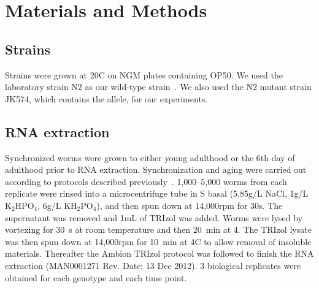 \section*{Materials and Methods}
\label{sec:materials_methods}

\subsection*{Strains}
\label{sub:Strains}
Strains were grown at 20\degree{}C on NGM plates containing \ecol{} OP50. We
used the laboratory \cel{} strain N2 as our wild-type strain~\citep{Brenner1974}.
We also used the N2 mutant strain JK574, which contains the 
allele, for our experiments.

\subsection*{RNA extraction}
\label{sb:rna_extraction}
Synchronized worms were grown to either young adulthood or the 6th day of
adulthood prior to RNA extraction. Synchronization and aging were carried out
according to protocols described previously~\citep{Leighton2014}. 1,000--5,000
worms from each replicate were rinsed into a microcentrifuge tube in S basal
(5.85g/L NaCl, 1g/L $\mathrm{K}_2\mathrm{HPO}_4$, 6g/L
$\mathrm{KH}_2\mathrm{PO}_4$), and then spun down at 14,000rpm for 30s. The
supernatant was removed and 1mL of TRIzol was added. Worms were lysed by
vortexing for 30~s at room temperature and then 20~min at 4\degree. The TRIzol
lysate was then spun down at 14,000rpm for 10~min at 4\degree{}C to allow
removal of insoluble materials. Thereafter the Ambion TRIzol protocol was
followed to finish the RNA extraction (MAN0001271 Rev. Date: 13 Dec 2012).
3 biological replicates were obtained for each genotype and each time point.

